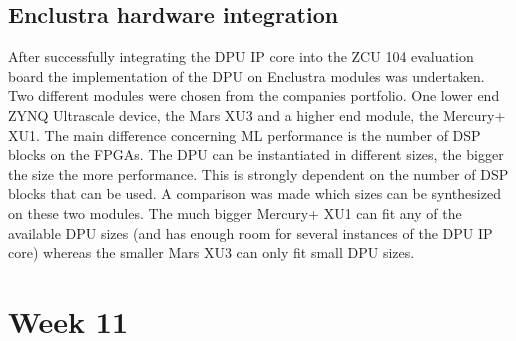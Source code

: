 \subsection{Enclustra hardware integration}
After successfully integrating the \ac{DPU} \ac{IP} core into the ZCU 104 evaluation board the implementation of the \ac{DPU} on Enclustra modules was undertaken. Two different modules were chosen from the companies portfolio. One lower end ZYNQ Ultrascale device, the Mars XU3 and a higher end module, the Mercury+ XU1. The main difference concerning \ac{ML} performance is the number of \ac{DSP} blocks on the \acp{FPGA}. The \ac{DPU} can be instantiated in different sizes, the bigger the size the more performance. This is strongly dependent on the number of \ac{DSP} blocks that can be used. A comparison was made which sizes can be synthesized on these two modules. The much bigger Mercury+ XU1 can fit any of the available \ac{DPU} sizes (and has enough room for several instances of the \ac{DPU} \ac{IP} core) whereas the smaller Mars XU3 can only fit small \ac{DPU} sizes.

\section{Week 11}
